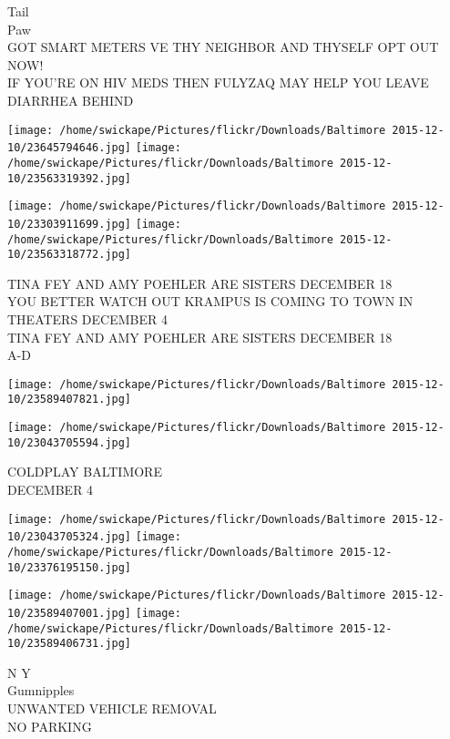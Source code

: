 \documentclass[10pt,letterpaper]{article}
\begin{document}
Tail\\
Paw\\
GOT SMART METERS VE THY NEIGHBOR AND THYSELF OPT OUT NOW!\\
IF YOU'RE ON HIV MEDS THEN FULYZAQ MAY HELP YOU LEAVE DIARRHEA BEHIND\\
\pagebreak

\texttt{[image: /home/swickape/Pictures/flickr/Downloads/Baltimore 2015-12-10/23645794646.jpg]}
\texttt{[image: /home/swickape/Pictures/flickr/Downloads/Baltimore 2015-12-10/23563319392.jpg]}

\texttt{[image: /home/swickape/Pictures/flickr/Downloads/Baltimore 2015-12-10/23303911699.jpg]}
\texttt{[image: /home/swickape/Pictures/flickr/Downloads/Baltimore 2015-12-10/23563318772.jpg]}

TINA FEY AND AMY POEHLER ARE SISTERS DECEMBER 18\\
YOU BETTER WATCH OUT KRAMPUS IS COMING TO TOWN IN THEATERS DECEMBER 4\\
TINA FEY AND AMY POEHLER ARE SISTERS DECEMBER 18\\
A{-}D\\
\pagebreak

\texttt{[image: /home/swickape/Pictures/flickr/Downloads/Baltimore 2015-12-10/23589407821.jpg]}

\vspace{0.25in}
\texttt{[image: /home/swickape/Pictures/flickr/Downloads/Baltimore 2015-12-10/23043705594.jpg]}

COLDPLAY BALTIMORE\\
DECEMBER 4\\
\pagebreak

\texttt{[image: /home/swickape/Pictures/flickr/Downloads/Baltimore 2015-12-10/23043705324.jpg]}
\texttt{[image: /home/swickape/Pictures/flickr/Downloads/Baltimore 2015-12-10/23376195150.jpg]}

\texttt{[image: /home/swickape/Pictures/flickr/Downloads/Baltimore 2015-12-10/23589407001.jpg]}
\texttt{[image: /home/swickape/Pictures/flickr/Downloads/Baltimore 2015-12-10/23589406731.jpg]}

N Y\\
Gumnipples\\
UNWANTED VEHICLE REMOVAL\\
NO PARKING\\
\pagebreak
\end{document}
